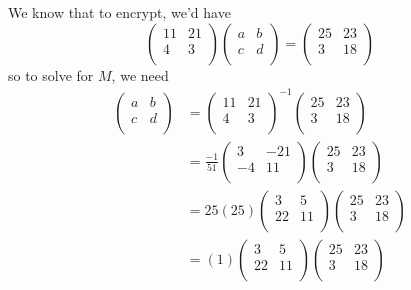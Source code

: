\documentclass[12pt]{amsart}
\theoremstyle{plain}
\theoremstyle{definition}
\begin{document}
\begin{enumerate}[1.]
\begin{framed}
	We know that to encrypt, we'd have $$\left( \begin{array}{rr}11&21\\4&3\\\end{array}\right)\left( \begin{array}{rr}a&b\\c&d\\\end{array}\right) = \left( \begin{array}{rr}25&23\\3&18\\\end{array}\right)$$
	so to solve for $M$, we need
	\begin{align*}
	\left( \begin{array}{rr}a&b\\c&d\\\end{array}\right) &= \left( \begin{array}{rr}11&21\\4&3\\\end{array}\right)^{-1}\left( \begin{array}{rr}25&23\\3&18\\\end{array}\right)\\
	&= \frac{-1}{51}\left( \begin{array}{rr}3&-21\\-4&11\\\end{array}\right)\left( \begin{array}{rr}25&23\\3&18\\\end{array}\right)\\
	&= 25(25) \left( \begin{array}{rr}3&5\\22&11\\\end{array}\right)\left( \begin{array}{rr}25&23\\3&18\\\end{array}\right)\\
	&= (1) \left( \begin{array}{rr}3&5\\22&11\\\end{array}\right)\left( \begin{array}{rr}25&23\\3&18\\\end{array}\right)\\

\end{align*}
\end{framed}
\end{enumerate}
\end{document}

